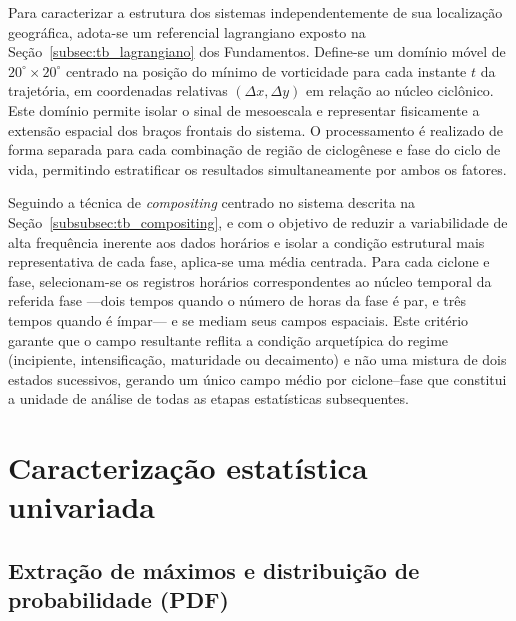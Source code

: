 Para caracterizar a estrutura dos sistemas independentemente de sua localização geográfica, adota-se um referencial lagrangiano exposto na Seção~\ref{subsec:tb_lagrangiano} dos Fundamentos. Define-se um domínio móvel de $20^{\circ} \times 20^{\circ}$ centrado na posição do mínimo de vorticidade para cada instante $t$ da trajetória, em coordenadas relativas $(\Delta x, \Delta y)$ em relação ao núcleo ciclônico. Este domínio permite isolar o sinal de mesoescala e representar fisicamente a extensão espacial dos braços frontais do sistema. O processamento é realizado de forma separada para cada combinação de região de ciclogênese e fase do ciclo de vida, permitindo estratificar os resultados simultaneamente por ambos os fatores.

Seguindo a técnica de \textit{compositing} centrado no sistema descrita na Seção~\ref{subsubsec:tb_compositing}, e com o objetivo de reduzir a variabilidade de alta frequência inerente aos dados horários e isolar a condição estrutural mais representativa de cada fase, aplica-se uma média centrada. Para cada ciclone e fase, selecionam-se os registros horários correspondentes ao núcleo temporal da referida fase ---dois tempos quando o número de horas da fase é par, e três tempos quando é ímpar--- e se mediam seus campos espaciais. Este critério garante que o campo resultante reflita a condição arquetípica do regime (incipiente, intensificação, maturidade ou decaimento) e não uma mistura de dois estados sucessivos, gerando um único campo médio por ciclone--fase que constitui a unidade de análise de todas as etapas estatísticas subsequentes.


\section{Caracterização estatística univariada}\label{sec:tecnicas_estadisticas}

\subsection{Extração de máximos e distribuição de probabilidade (PDF)}\label{subsec:extraccion_pdf}

